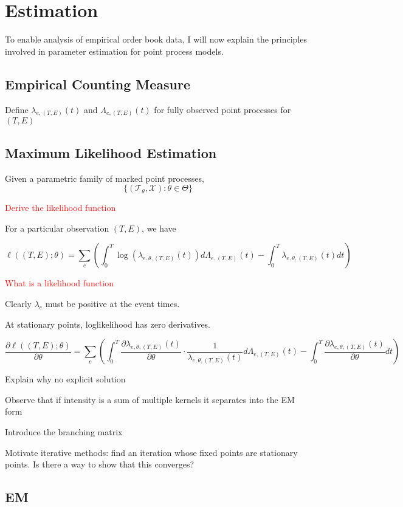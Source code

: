 \documentclass[honours,12pt]{unswthesis}
\numberwithin{equation}{section}
\begin{document}
\chapter{Estimation}%

To enable analysis of empirical order book data, I will now explain the principles involved in parameter estimation for point process models.

\section{Empirical Counting Measure}
Define $\lambda_{e,(T,E)}(t)$ and $\Lambda_{e,(T,E)}(t)$ for fully observed point processes for $(T,E)$

\section{Maximum Likelihood Estimation}
Given a parametric family of marked point processes,
$$\{(\mathcal{T}_\theta,\mathcal{X}) : \theta\in\Theta\}$$


\textcolor{red}{Derive the likelihood function}

For a particular observation $(T,E)$, we have

$$\ell((T,E);\theta) = \sum_e \left(\int_0^T \log(\lambda_{e,\theta,(T,E)}(t))d\Lambda_{e,(T,E)}(t)-\int_0^T \lambda_{e,\theta,(T,E)}(t)dt\right)$$

\textcolor{red}{What is a likelihood function}


Clearly $\lambda_e$ must be positive at the event times.

At stationary points, loglikelihood has zero derivatives.

$$\frac{\partial \ell((T,E);\theta)}{\partial \theta} = \sum_{e}\left(\int_0^T \frac{\partial \lambda_{e,\theta,(T,E)}(t)}{\partial \theta}\cdot\frac{1}{\lambda_{e,\theta,(T,E)}(t)}d\Lambda_{e,(T,E)}(t) - \int_0^T \frac{\partial\lambda_{e,\theta,(T,E)}(t)}{\partial \theta}dt\right)$$

Explain why no explicit solution

Observe that if intensity is a sum of multiple kernels it separates into the EM form

Introduce the branching matrix

Motivate iterative methods: find an iteration whose fixed points are stationary points. Is there a way to show that this converges?

\section{EM}
\end{document}
